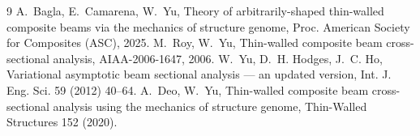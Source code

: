 \documentclass[11pt]{article}
\begin{document}
\begin{thebibliography}{9}
 A.~Bagla, E.~Camarena, W.~Yu, Theory of arbitrarily-shaped
thin-walled composite beams via the mechanics of structure genome, Proc. American
Society for Composites (ASC), 2025.
 M.~Roy, W.~Yu, Thin-walled composite beam cross-sectional
analysis, AIAA-2006-1647, 2006.
 W.~Yu, D.~H. Hodges, J.~C. Ho, Variational asymptotic beam
sectional analysis --- an updated version, Int. J. Eng. Sci. 59 (2012) 40--64.
 A.~Deo, W.~Yu, Thin-walled composite beam cross-sectional
analysis using the mechanics of structure genome, Thin-Walled Structures 152 (2020).
\end{thebibliography}
\end{document}
